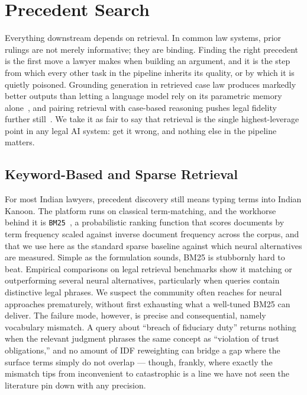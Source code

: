 \section{Precedent Search}

Everything downstream depends on retrieval. In common law systems, prior rulings are not merely informative; they are binding. Finding the right precedent is the first move a lawyer makes when building an argument, and it is the step from which every other task in the pipeline inherits its quality, or by which it is quietly poisoned. Grounding generation in retrieved case law produces markedly better outputs than letting a language model rely on its parametric memory alone~\cite{nigam-etal-2025-nyayarag}, and pairing retrieval with case-based reasoning pushes legal fidelity further still~\cite{wiratunga-etal-2024-cbrrag}. We take it as fair to say that retrieval is the single highest-leverage point in any legal AI system: get it wrong, and nothing else in the pipeline matters.

\subsection{Keyword-Based and Sparse Retrieval}

For most Indian lawyers, precedent discovery still means typing terms into Indian Kanoon. The platform runs on classical term-matching, and the workhorse behind it is \texttt{BM25}~\cite{rosa-etal-2021-bm25}, a probabilistic ranking function that scores documents by term frequency scaled against inverse document frequency across the corpus, and that we use here as the standard sparse baseline against which neural alternatives are measured. Simple as the formulation sounds, BM25 is stubbornly hard to beat. Empirical comparisons on legal retrieval benchmarks show it matching or outperforming several neural alternatives, particularly when queries contain distinctive legal phrases. We suspect the community often reaches for neural approaches prematurely, without first exhausting what a well-tuned BM25 can deliver. The failure mode, however, is precise and consequential, namely vocabulary mismatch. A query about ``breach of fiduciary duty'' returns nothing when the relevant judgment phrases the same concept as ``violation of trust obligations,'' and no amount of IDF reweighting can bridge a gap where the surface terms simply do not overlap — though, frankly, where exactly the mismatch tips from inconvenient to catastrophic is a line we have not seen the literature pin down with any precision.

